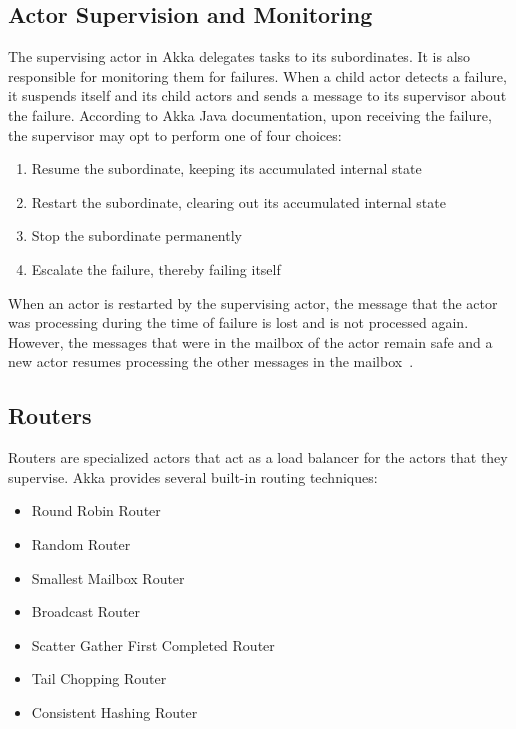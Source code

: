   \subsection{Actor Supervision and Monitoring}
  \label{subsec:supervisionMonitoring}
  The supervising actor in Akka delegates tasks to its subordinates. It is also responsible for monitoring them for failures. When a child actor detects a failure, it suspends itself and its child actors and sends a message to its supervisor about the failure. According to Akka Java documentation\cite{akkaJavaDoc}, upon receiving the failure, the supervisor may opt to perform one of four choices:
  \begin{enumerate}
    \item Resume the subordinate, keeping its accumulated internal state
    \item Restart the subordinate, clearing out its accumulated internal state
    \item Stop the subordinate permanently
    \item Escalate the failure, thereby failing itself
  \end{enumerate}

  When an actor is restarted by the supervising actor, the message that the actor was processing during the time of failure is lost and is not processed again. However, the messages that were in the mailbox of the actor remain safe and a new actor resumes processing the other messages in the mailbox~\cite{akkaJavaDoc}.

  \subsection{Routers}
  \label{subsec:akka-routers}
  Routers are specialized actors that act as a load balancer for the actors that they supervise. Akka provides several built-in routing techniques:~\cite{akkaJavaDoc}
  \begin{itemize}
    \item Round Robin Router
    \item Random Router
    \item Smallest Mailbox Router
    \item Broadcast Router
    \item Scatter Gather First Completed Router
    \item Tail Chopping Router
    \item Consistent Hashing Router
  \end{itemize}

